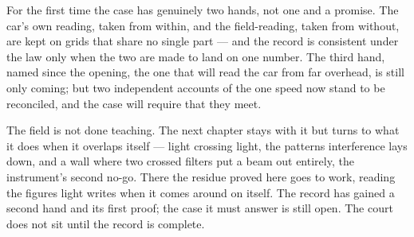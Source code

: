 For the first time the case has genuinely two hands, not one and a promise. The car's own reading, taken from
within, and the field-reading, taken from without, are kept on grids that share no single part --- and the
record is consistent under the law only when the two are made to land on one number. The third hand, named
since the opening, the one that will read the car from far overhead, is still only coming; but two independent
accounts of the one speed now stand to be reconciled, and the case will require that they meet.

The field is not done teaching. The next chapter stays with it but turns to what it does when it overlaps
itself --- light crossing light, the patterns interference lays down, and a wall where two crossed filters put
a beam out entirely, the instrument's second no-go. There the residue proved here goes to work, reading the
figures light writes when it comes around on itself. The record has gained a second hand and its first proof;
the case it must answer is still open. The court does not sit until the record is complete.
